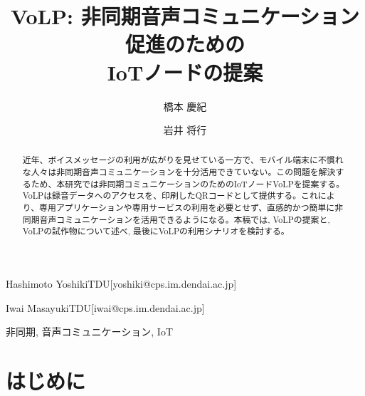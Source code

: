 \documentclass[submit,techrep,noauthor]{ipsj}
\begin{document}
\title{VoLP: 非同期音声コミュニケーション促進のための\\IoTノードの提案}

\author{橋本 慶紀}{Hashimoto Yoshiki}{TDU}[yoshiki@cps.im.dendai.ac.jp]
\author{岩井 将行}{Iwai Masayuki}{TDU}[iwai@cps.im.dendai.ac.jp]

\begin{abstract}
近年、ボイスメッセージの利用が広がりを見せている一方で、モバイル端末に不慣れな人々は非同期音声コミュニケーションを十分活用できていない。この問題を解決するため、本研究では非同期コミュニケーションのためのIoTノードVoLPを提案する。VoLPは録音データへのアクセスを、印刷したQRコードとして提供する。これにより、専用アプリケーションや専用サービスの利用を必要とせず、直感的かつ簡単に非同期音声コミュニケーションを活用できるようになる。本稿では, VoLPの提案と, VoLPの試作物について述べ, 最後にVoLPの利用シナリオを検討する。

\end{abstract}

\begin{jkeyword}
非同期, 音声コミュニケーション, IoT
\end{jkeyword}

\maketitle

\section{はじめに}

\end{document}
